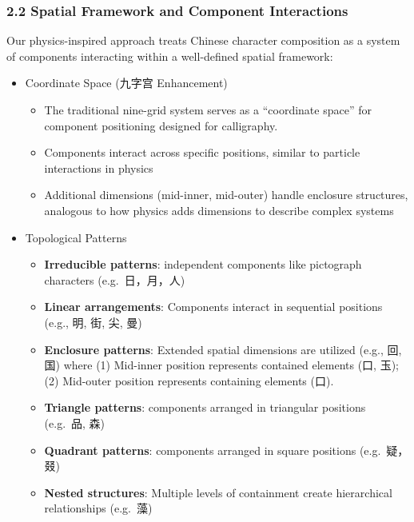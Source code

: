 \documentclass[
  11pt,
  letterpaper,
]{article}
\providecommand{\tightlist}{%
  \setlength{\itemsep}{0pt}\setlength{\parskip}{0pt}}
\begin{document}
\subsubsection{2.2 Spatial Framework and Component
Interactions}\label{spatial-framework-and-component-interactions}

Our physics-inspired approach treats Chinese character composition as a
system of components interacting within a well-defined spatial
framework:

\begin{itemize}
\tightlist
\item
  Coordinate Space (九字宫 Enhancement)

  \begin{itemize}
  \tightlist
  \item
    The traditional nine-grid system serves as a ``coordinate space''
    for component positioning designed for calligraphy.
  \item
    Components interact across specific positions, similar to particle
    interactions in physics
  \item
    Additional dimensions (mid-inner, mid-outer) handle enclosure
    structures, analogous to how physics adds dimensions to describe
    complex systems
  \end{itemize}
\item
  Topological Patterns

  \begin{itemize}
  \tightlist
  \item
    \textbf{Irreducible patterns}: independent components like
    pictograph characters (e.g.~日，月，人)
  \item
    \textbf{Linear arrangements}: Components interact in sequential
    positions (e.g., 明, 街, 尖, 曼)
  \item
    \textbf{Enclosure patterns}: Extended spatial dimensions are
    utilized (e.g., 回, 国) where (1) Mid-inner position represents
    contained elements (口, 玉); (2) Mid-outer position represents
    containing elements (口).
  \item
    \textbf{Triangle patterns}: components arranged in triangular
    positions (e.g.~品, 森)
  \item
    \textbf{Quadrant patterns}: components arranged in square positions
    (e.g.~疑，叕)
  \item
    \textbf{Nested structures}: Multiple levels of containment create
    hierarchical relationships (e.g.~藻)
  \end{itemize}
\end{itemize}
\end{document}
